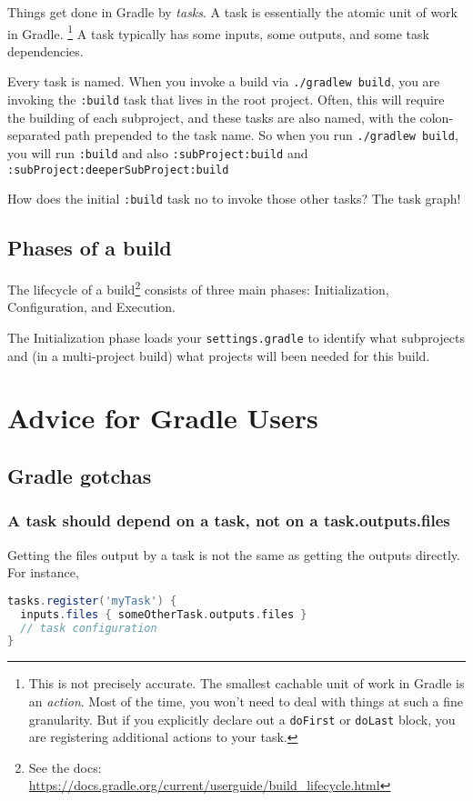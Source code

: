 \documentclass[]{article}
\theoremstyle{definition}
\begin{document}
Things get done in Gradle by \emph{tasks}.
A task is essentially the atomic unit of work in Gradle.%
\footnote{This is not precisely accurate.
  The smallest cachable unit of work in Gradle is an \emph{action}.
  Most of the time, you won't need to deal with things at such a fine granularity.
  But if you explicitly declare out a \texttt{doFirst} or \texttt{doLast} block, you are registering additional actions to your task.
}
A task typically has some inputs, some outputs, and some task dependencies.

Every task is named.
When you invoke a build via \texttt{./gradlew build}, you are invoking the \texttt{:build} task that lives in the root project.
Often, this will require the building of each subproject, and these tasks are also named, with the colon-separated path prepended to the task name.
So when you run \texttt{./gradlew build}, you will run \texttt{:build} and also \texttt{:subProject:build} and \texttt{:subProject:deeperSubProject:build}

How does the initial \texttt{:build} task no to invoke those other tasks?
The task graph!

\subsection{Phases of a build}
The lifecycle of a build\footnote{See the docs: \url{https://docs.gradle.org/current/userguide/build_lifecycle.html}} consists of three main phases: Initialization, Configuration, and Execution.

The Initialization phase loads your \texttt{settings.gradle} to identify what subprojects and (in a multi-project build) what projects will been needed for this build.



\section{Advice for Gradle Users}

\subsection{Gradle gotchas}

\subsubsection{A task should depend on a task, not on a task.outputs.files}
Getting the files output by a task is not the same as getting the outputs directly.  For instance,
\begin{lstlisting}[language=Groovy]
tasks.register('myTask') {
  inputs.files { someOtherTask.outputs.files }
  // task configuration
}
\end{lstlisting}
\end{document}
